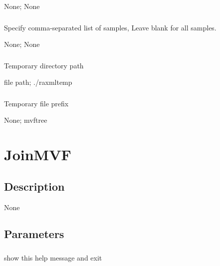 \documentclass[letterpaper,11pt,english]{sphinxmanual}
\begin{document}
 None;  None


\subsubsection{}
\label{\detokenize{prog_desc:id117}}
 Specify comma-separated list of samples, Leave blank for all samples.

 None;  None


\subsubsection{}
\label{\detokenize{prog_desc:id118}}
 Temporary directory path

 file path;  ./raxmltemp


\subsubsection{}
\label{\detokenize{prog_desc:temp-prefix-tempprefix}}
 Temporary file prefix

 None;  mvftree


\section{JoinMVF}
\label{\detokenize{prog_desc:joinmvf}}

\subsection{Description}
\label{\detokenize{prog_desc:id119}}
None


\subsection{Parameters}
\label{\detokenize{prog_desc:id120}}

\subsubsection{}
\label{\detokenize{prog_desc:id121}}
 show this help message and exit
\end{document}
